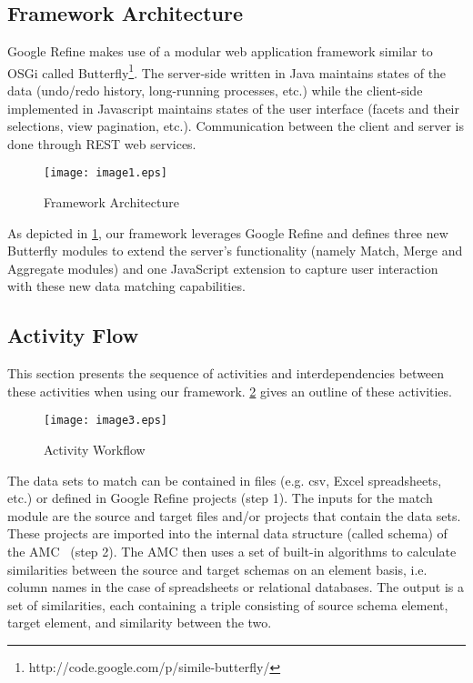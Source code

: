 
\subsection{Framework Architecture}
Google Refine makes use of a modular web application framework similar to OSGi called Butterfly\footnote{http://code.google.com/p/simile-butterfly/}. The server-side written in Java maintains states of the data (undo/redo history, long-running processes, etc.) while the client-side implemented in Javascript maintains states of the user interface (facets and their selections, view pagination, etc.). Communication between the client and server is done through REST web services.

\begin{figure}[ht!]
  \centering
    \texttt{[image: image1.eps]}
  \caption{Framework Architecture}
  \label{fig:framework_architecture}
\end{figure}

As depicted in \ref{fig:framework_architecture}, our framework leverages Google Refine and defines three new Butterfly modules to extend the server's functionality (namely Match, Merge and Aggregate modules) and one JavaScript extension to capture user interaction with these new data matching capabilities.

\subsection{Activity Flow}
This section presents the sequence of activities and interdependencies between these activities when using our framework. \ref{fig:Activity_workflow} gives an outline of these activities.

\begin{figure}[ht!]
  \centering
    \texttt{[image: image3.eps]}
  \caption{Activity Workflow}
  \label{fig:Activity_workflow}
\end{figure}

The data sets to match can be contained in files (e.g. csv, Excel spreadsheets, etc.) or defined in Google Refine projects (step 1). The inputs for the match module are the source and target files and/or projects that contain the data sets. These projects are imported into the internal data structure (called schema) of the AMC~\cite{Peukert:ICDE:11} (step 2). The AMC then uses a set of built-in algorithms to calculate similarities between the source and target schemas on an element basis, i.e. column names in the case of spreadsheets or relational databases. The output is a set of similarities, each containing a triple consisting of source schema element, target element, and similarity between the two.

